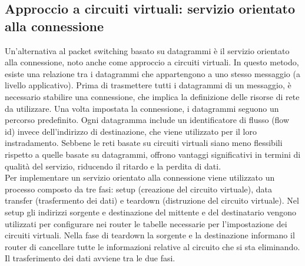 \documentclass[12pt]{report}
\begin{document}
	\subsection{Approccio a circuiti virtuali: servizio orientato alla connessione}
	Un'alternativa al packet switching basato su datagrammi è il servizio orientato alla connessione, noto anche come approccio a circuiti virtuali. In questo metodo, esiste una relazione tra i datagrammi che appartengono a uno stesso messaggio (a livello applicativo). Prima di trasmettere tutti i datagrammi di un messaggio, è necessario stabilire una connessione, che implica la definizione delle risorse di rete da utilizzare. Una volta impostata la connessione, i datagrammi seguono un percorso predefinito. Ogni datagramma include un identificatore di flusso (flow id) invece dell'indirizzo di destinazione, che viene utilizzato per il loro instradamento. Sebbene le reti basate su circuiti virtuali siano meno flessibili rispetto a quelle basate su datagrammi, offrono vantaggi significativi in termini di qualità del servizio, riducendo il ritardo e la perdita di dati.
	\vspace{\baselineskip}\\
	Per implementare un servizio orientato alla connessione viene utilizzato un processo composto da tre fasi: setup (creazione del circuito virtuale), data transfer (trasfermento dei dati) e teardown (distruzione del circuito virtuale). Nel setup gli indirizzi sorgente e destinazione del mittente e del destinatario vengono utilizzati per configurare nei router le tabelle necessarie per l'impostazione dei circuiti virtuali. Nella fase di teardown la sorgente e la destinazione informano il router di cancellare tutte le informazioni relative al circuito che si sta eliminando. Il trasferimento dei dati avviene tra le due fasi.
\end{document}
